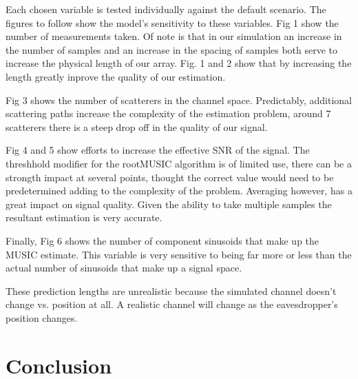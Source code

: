 \documentclass{allertonproc}
\begin{document}

Each chosen variable is tested individually against the default scenario. The figures to follow show the model's sensitivity to these variables. Fig 1 show the number of measurements taken. Of note is that in our simulation an increase in the number of samples and an increase in the spacing of samples both serve to increase the physical length of our array. Fig. 1 and 2 show that by increasing the length greatly inprove the quality of our estimation.

 Fig 3 shows the number of scatterers in the channel space. Predictably, additional scattering paths increase the complexity of the estimation problem, around 7 scatterers there is a  steep drop off in the quality of our signal. 

Fig 4 and 5 show efforts to increase the effective SNR of the signal. The threshhold modifier for the rootMUSIC algorithm is of limited use, there can be a strongth impact at several points, thought the correct value would need to be predetermined adding to the complexity of the problem. Averaging however, has a great impact on signal quality. Given the ability to take multiple samples the resultant estimation is very accurate. 

Finally, Fig 6 shows the number of component sinusoids that make up the MUSIC estimate. This variable is very sensitive to being far more or less than the actual number of sinusoids that make up a signal space. %


These prediction lengths are unrealistic because the simulated channel doesn't change vs. position at all.  A realistic channel will change as the eavesdropper's position changes. 

\section{Conclusion}
\end{document}
